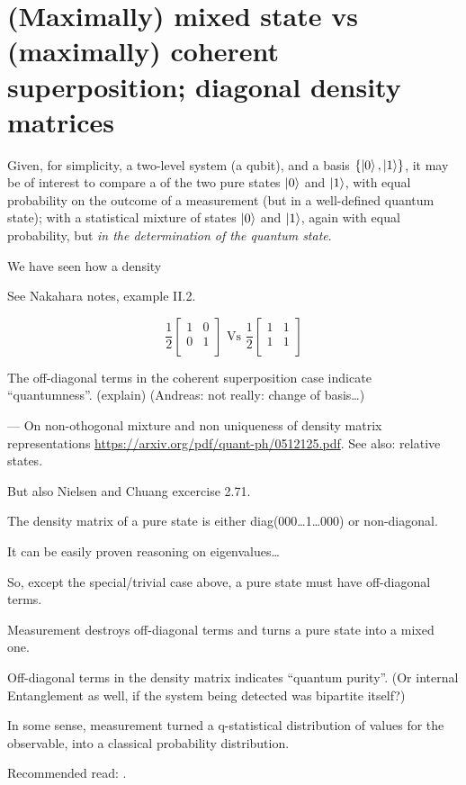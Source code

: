 \section{(Maximally) mixed state vs (maximally) coherent superposition; diagonal density matrices}

Given, for simplicity, a two-level system (a qubit), and a basis
$\{\ket{0}, \ket{1}\}$, it may be of interest to compare a 
of the two pure states $\ket{0}$ and $\ket{1}$, with equal probability on the outcome of
a measurement (but in a well-defined quantum state); with a statistical mixture of
states $\ket{0}$ and $\ket{1}$, again with equal probability, but 
\emph{in the determination of the quantum state}.

We have seen how a density 

See Nakahara notes, example II.2.

$$
\frac{1}{2}\begin{bmatrix}
  1 &0  \\
  0 &1  \\
\end{bmatrix}
\text{ Vs }
\frac{1}{2}\begin{bmatrix}
  1 &1  \\
  1 &1  \\
\end{bmatrix}
$$

The off-diagonal terms in the coherent superposition case indicate
``quantumness''. (explain) (Andreas: not really: change of basis\dots)

--- On non-othogonal mixture and non uniqueness of density matrix representations
\url{https://arxiv.org/pdf/quant-ph/0512125.pdf}. See also: relative states.

But also Nielsen and Chuang excercise  2.71.

\begin{remark}
  The density matrix of a pure state is either diag(000\dots1\dots000) or non-diagonal.

  It can be easily proven reasoning on eigenvalues\dots

  So, except the special/trivial case above, a pure state must have off-diagonal terms.
\end{remark}

Measurement destroys off-diagonal terms and turns a pure state into a mixed one.

Off-diagonal terms in the density matrix indicates ``quantum purity''.
(Or internal Entanglement as well, if the system being detected was bipartite itself?)

In some sense, measurement turned a q-statistical distribution of values for the observable,
into a classical probability distribution.

Recommended read: \cite{Zurek_Decoherence, Zurek_Fundamentals}.

